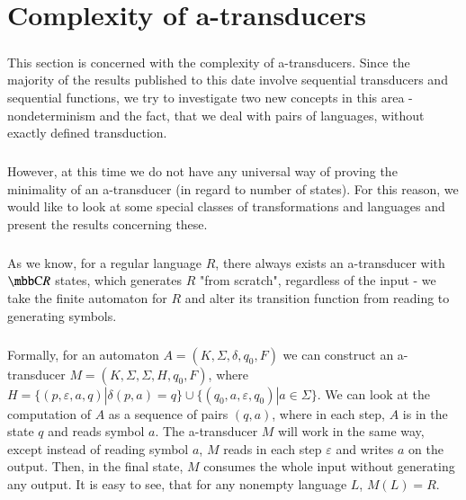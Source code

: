 \chapter{Complexity of a-transducers}
\label{chap:complexity}

\paragraph{}
This section is concerned with the complexity of a-transducers. Since the majority of the results published to this date involve sequential transducers and sequential functions, we try to investigate two new concepts in this area - nondeterminism and the fact, that we deal with pairs of languages, without exactly defined transduction.

\paragraph{}
However, at this time we do not have any universal way of proving the minimality of an a-transducer (in regard to number of states). For this reason, we would like to look at some special classes of transformations and languages and present the results concerning these.

\paragraph{}
As we know, for a regular language $R$, there always exists an a-transducer with $\C{R}$ states, which generates $R$ "from scratch", regardless of the input - we take the finite automaton for $R$ and alter its transition function from reading to generating symbols.

\paragraph{}
Formally, for an automaton $A = (K, \Sigma, \delta, q_0, F)$ we can construct an a-transducer $M = (K, \Sigma, \Sigma, H, q_0, F)$, where $H = \{ (p, \varepsilon, a, q) | \delta (p, a) = q\} \cup \{ (q_0, a, \varepsilon, q_0) | a \in \Sigma \} $. We can look at the computation of $A$ as a sequence of pairs $(q, a)$, where in each step, $A$ is in the state $q$ and reads symbol $a$. The a-transducer $M$ will work in the same way, except instead of reading symbol $a$, $M$ reads in each step $\varepsilon$ and writes $a$ on the output. Then, in the final state, $M$ consumes the whole input without generating any output. It is easy to see, that for any nonempty language $L$, $M(L) = R$.


